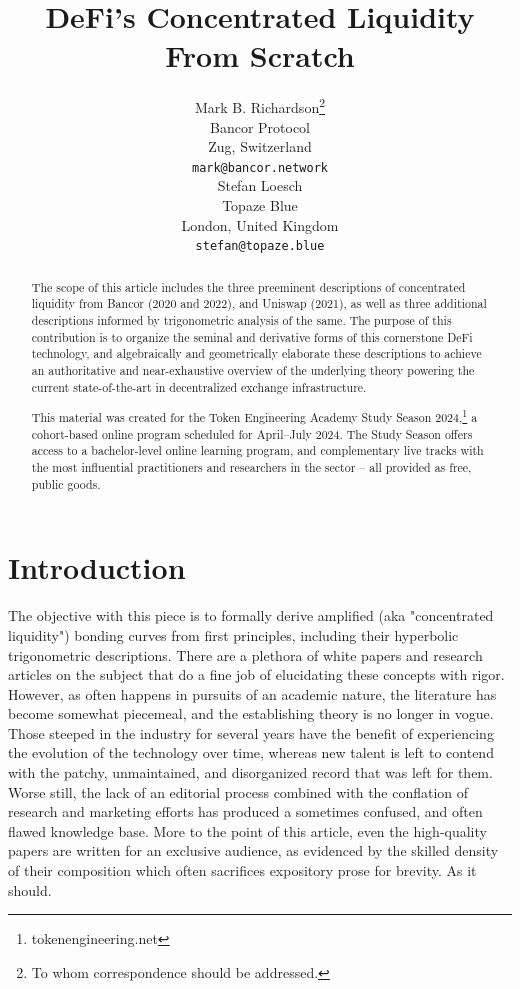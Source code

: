 \documentclass{article}
\title{DeFi's Concentrated Liquidity From Scratch}
\author{ 
    Mark B. Richardson\thanks{To whom correspondence should be addressed.} \\
    Bancor Protocol \\
    Zug, Switzerland \\
    \texttt{mark@bancor.network} \\
    \And
    Stefan Loesch \\
    Topaze Blue \\
    London, United Kingdom \\
    \texttt{stefan@topaze.blue}
}
\begin{document}
\maketitle

\begin{abstract}
The scope of this article includes the three preeminent descriptions of concentrated liquidity from Bancor (2020 and 2022), and Uniswap (2021), as well as three additional descriptions informed by trigonometric analysis of the same. The purpose of this contribution is to organize the seminal and derivative forms of this cornerstone DeFi technology, and algebraically and geometrically elaborate these descriptions to achieve an authoritative and near-exhaustive overview of the underlying theory powering the current state-of-the-art in decentralized exchange infrastructure.           

This material was created for the Token Engineering Academy Study Season 2024,\footnote{tokenengineering.net} a cohort-based online program scheduled for April–July 2024. The Study Season offers access to a bachelor-level online learning program, and complementary live tracks with the most influential practitioners and researchers in the sector – all provided as free, public goods.
\end{abstract}


\clearpage
\tableofcontents
\clearpage

\section{Introduction}\label{sec1}

The objective with this piece is to formally derive amplified (aka "concentrated liquidity") bonding curves from first principles, including their hyperbolic trigonometric descriptions. There are a plethora of white papers and research articles on the subject that do a fine job of elucidating these concepts with rigor. However, as often happens in pursuits of an academic nature, the literature has become somewhat piecemeal, and the establishing theory is no longer in vogue. Those steeped in the industry for several years have the benefit of experiencing the evolution of the technology over time, whereas new talent is left to contend with the patchy, unmaintained, and disorganized record that was left for them. Worse still, the lack of an editorial process combined with the conflation of research and marketing efforts has produced a sometimes confused, and often flawed knowledge base. More to the point of this article, even the high-quality papers are written for an exclusive audience, as evidenced by the skilled density of their composition which often sacrifices expository prose for brevity. As it should.
\end{document}
